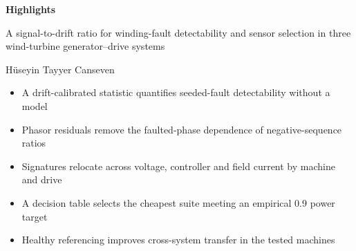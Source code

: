\documentclass[12pt]{article}
\begin{document}
\noindent\textbf{Highlights}

\medskip
\noindent A signal-to-drift ratio for winding-fault detectability and sensor selection in three wind-turbine generator--drive systems

\smallskip
\noindent H\"useyin Tayyer Canseven

\begin{itemize}
  \item A drift-calibrated statistic quantifies seeded-fault detectability without a model
  \item Phasor residuals remove the faulted-phase dependence of negative-sequence ratios
  \item Signatures relocate across voltage, controller and field current by machine and drive
  \item A decision table selects the cheapest suite meeting an empirical 0.9 power target
  \item Healthy referencing improves cross-system transfer in the tested machines
\end{itemize}
\end{document}
